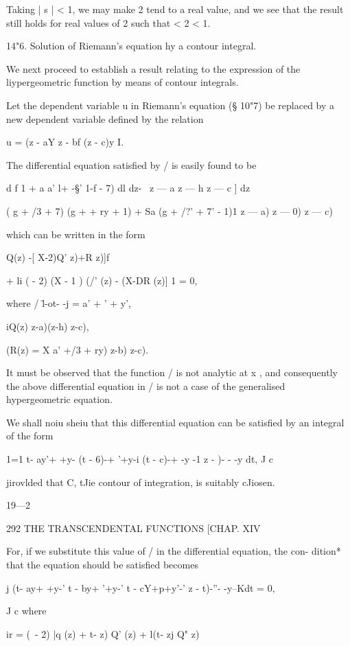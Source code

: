 Taking | s | < 1, we may make 2 tend to a real value, and we see that the result still 
holds for real values of 2 such that < 2 < 1. 

14"6. Solution of Riemann's equation hy a contour integral. 

We next proceed to establish a result relating to the expression of the 
liypergeometric function by means of contour integrals. 

Let the dependent variable u in Riemann's equation (§ 10"7) be replaced 
by a new dependent variable   defined by the relation 

u = (z - aY  z - bf (z - c)y I. 

The differential equation satisfied by / is easily found to be 

d  f 1 + a a' l+ -§' 1-f - 7) dl 
dz- \ z — a z — h z — c ] dz 

( g + /3 + 7)  (g +   + ry + 1)   + Sa (g + /?' + 7' - 1)1 
 z — a) z — 0)  z — c) 

which can be written in the form 

Q(z)  -[ X-2)Q' z)+R z)]f  

+ li (  - 2) (X - 1 ) (/' (z) - (X-DR (z)] 1 = 0, 

where / \=l-ot- -j = a' +  ' + y', 

iQ(z)  z-a)(z-h) z-c), 

(R(z) = X a' +/3 + ry) z-b) z-c). 

It must be observed that the function / is not analytic at x , and consequently the 
above differential equation in / is not a case of the generalised hypergeometric equation. 

We shall noiu sheiu that this differential equation can be satisfied by an 
integral of the form 

1=1  t- ay'+ +y-  (t - 6)-+ '+y-i (t - c)-+ -y -1  z -  )- - -y dt, 
J c 

jirovlded that C, tJie contour of integration, is suitably cJiosen. 

19—2 



292 THE TRANSCENDENTAL FUNCTIONS [CHAP. XIV 

For, if we substitute this value of / in the differential equation, the con- 
dition* that the equation should be satisfied becomes 

j (t- ay+ +y-'  t - by+ '+y-'  t - cY+p+y'-'  z - t)-''- -y--Kdt = 0, 

J c 
where 

ir = (\ - 2) |q (z) +  t- z) Q' (z) + l(t- zj Q"  z) 



